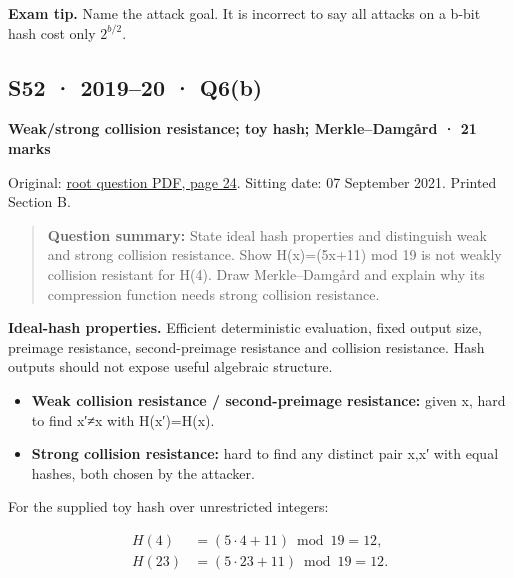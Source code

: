 \documentclass[11pt,a4paper]{article}
\begin{document}
{\color{ForestGreen}\textbf{Exam tip.} Name the attack goal. It is incorrect to say all attacks on a b-bit hash cost only \(2^{b/2}\).}




\clearpage
\subsection{S52 · 2019–20 · Q6(b)}\label{s52}

\textbf{Weak/\allowbreak{}strong collision resistance; toy hash; Merkle–Damgård · 21 marks}


Original: \href{../../CSE405-Security_Merged.pdf\#page=24}{root question PDF,\allowbreak{} page 24}. Sitting date: 07 September 2021. Printed Section B.



\begin{quote}\small

\textbf{Question summary:} State ideal hash properties and distinguish weak and strong collision resistance. Show H(x)=\allowbreak{}(5x+11) mod 19 is not weakly collision resistant for H(4). Draw Merkle–Damgård and explain why its compression function needs strong collision resistance.



\end{quote}

\textbf{Ideal-hash properties.} Efficient deterministic evaluation,\allowbreak{} fixed output size,\allowbreak{} preimage resistance,\allowbreak{} second-preimage resistance and collision resistance. Hash outputs should not expose useful algebraic structure.



\begin{itemize}

\item \textbf{Weak collision resistance /\allowbreak{} second-preimage resistance:} given x,\allowbreak{} hard to find x′≠x with H(x′)=\allowbreak{}H(x).

\item \textbf{Strong collision resistance:} hard to find any distinct pair x,\allowbreak{}x′ with equal hashes,\allowbreak{} both chosen by the attacker.

\end{itemize}

For the supplied toy hash over unrestricted integers:



\[
\begin{aligned}H(4)&=(5\cdot4+11)\bmod19=12,\\H(23)&=(5\cdot23+11)\bmod19=12.\end{aligned}
\]
\end{document}
